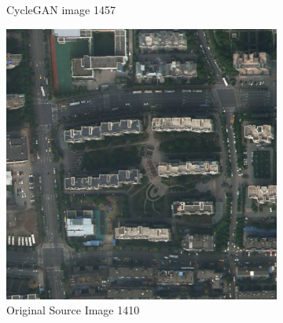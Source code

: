 \documentclass[10pt,twocolumn,letterpaper]{article}
\begin{document}
{\begin{figure}[t]
\begin{minipage}{0.48\textwidth}
\begin{subfigure}[b]{0.45\textwidth}
                \caption{CycleGAN image 1457}
                \label{fig:image4}
            \end{subfigure}
            \caption{Comparison between original images and CycleGAN-generated images (Left Block).}
            \label{fig:left_block}
        \end{minipage}
        \hfill
        \begin{minipage}{0.48\textwidth} %
            \centering
            \begin{subfigure}[b]{0.45\textwidth}
                \includegraphics[width=\textwidth]{images/1410.png}
                \caption{Original Source Image 1410}
            \end{subfigure}
            \hspace{2mm}
            \begin{subfigure}[b]{0.45\textwidth}

\end{subfigure}
\end{minipage}
\end{figure}}
\end{document}
